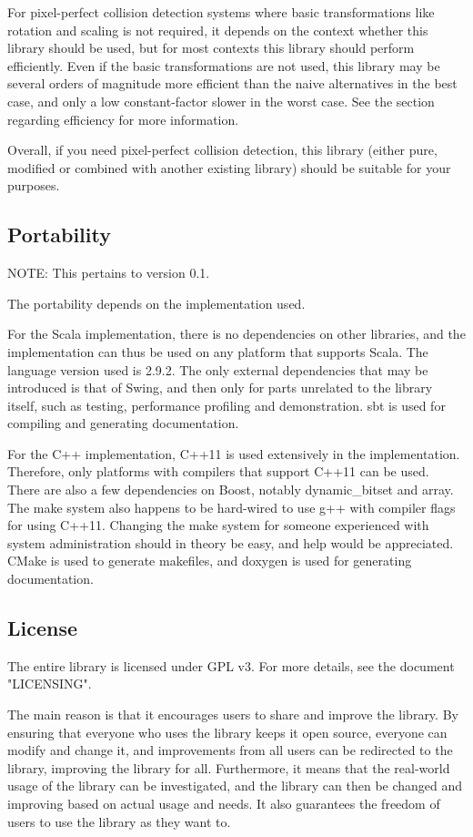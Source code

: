 For pixel-perfect collision detection systems where basic transformations like rotation and scaling
is not required, it depends on the context whether this library should be used, but for most
contexts this library should perform efficiently. Even if the basic transformations are not used,
this library may be several orders of magnitude more efficient than the naive alternatives
in the best case, and only a low constant-factor slower in the worst case.
See the section regarding efficiency for more information.

Overall, if you need pixel-perfect collision detection, this library (either pure, modified or
combined with another existing library) should be suitable for your purposes.

\subsection{Portability}

NOTE: This pertains to version 0.1.

The portability depends on the implementation used.

For the Scala implementation, there is no dependencies on other libraries,
and the implementation can thus be used on any platform that supports Scala.
The language version used is 2.9.2.
The only external dependencies that may be introduced is that of Swing,
and then only for parts unrelated to the library itself, such as
testing, performance profiling and demonstration.
sbt is used for compiling and generating documentation.

For the C++ implementation, C++11 is used extensively in the implementation.
Therefore, only platforms with compilers that support C++11 can be used.
There are also a few dependencies on Boost, notably dynamic\_bitset
and array.
The make system also happens to be hard-wired to use g++ with compiler
flags for using C++11. Changing the make system for someone experienced
with system administration should in theory be easy, and help would be
appreciated. CMake is used to generate makefiles, and doxygen is used for
generating documentation.

\subsection{License}

The entire library is licensed under GPL v3. For more details, see the document
"LICENSING".

The main reason is that it encourages users to share and improve the library.
By ensuring that everyone who uses the library keeps it open source,
everyone can modify and change it, and improvements from all users can be
redirected to the library, improving the library for all.
Furthermore, it means that the real-world usage of the library can be investigated,
and the library can then be changed and improving based on actual usage and needs.
It also guarantees the freedom of users to use the library as they want to.

